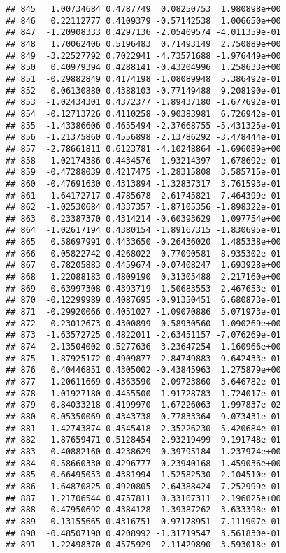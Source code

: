 \documentclass[
]{article}
\begin{document}
\begin{verbatim}
## 845   1.00734684 0.4787749  0.08250753  1.980898e+00
## 846   0.22112777 0.4109379 -0.57142538  1.006650e+00
## 847  -1.20908333 0.4297136 -2.05409574 -4.011359e-01
## 848   1.70062406 0.5196483  0.71493149  2.750889e+00
## 849  -3.22527792 0.7022941 -4.73571688 -1.976449e+00
## 850   0.40979394 0.4288141 -0.43204996  1.258633e+00
## 851  -0.29882849 0.4174198 -1.08089948  5.386492e-01
## 852   0.06130880 0.4388103 -0.77149488  9.208190e-01
## 853  -1.02434301 0.4372377 -1.89437180 -1.677692e-01
## 854  -0.12713726 0.4110258 -0.90383981  6.726942e-01
## 855  -1.43386606 0.4655494 -2.37668755 -5.431325e-01
## 856  -1.21375860 0.4556898 -2.13786292 -3.478444e-01
## 857  -2.78661811 0.6123781 -4.10248864 -1.696089e+00
## 858  -1.02174386 0.4434576 -1.93214397 -1.678692e-01
## 859  -0.47288039 0.4217475 -1.28315808  3.585715e-01
## 860  -0.47691630 0.4313894 -1.32837317  3.761593e-01
## 861  -1.64172717 0.4785678 -2.61745821 -7.464399e-01
## 862  -1.02530684 0.4337357 -1.87105356 -1.898322e-01
## 863   0.23387370 0.4314214 -0.60393629  1.097754e+00
## 864  -1.02617194 0.4380154 -1.89167315 -1.830695e-01
## 865   0.58697991 0.4433650 -0.26436020  1.485338e+00
## 866   0.05822742 0.4268022 -0.77090581  8.935302e-01
## 867   0.78205883 0.4459674 -0.07408247  1.693928e+00
## 868   1.22088183 0.4809190  0.31305488  2.217160e+00
## 869  -0.63997308 0.4393719 -1.50683553  2.467653e-01
## 870  -0.12299989 0.4087695 -0.91350451  6.680873e-01
## 871  -0.29920066 0.4051027 -1.09070886  5.071973e-01
## 872   0.23012673 0.4300899 -0.58930560  1.090269e+00
## 873  -1.63572725 0.4822011 -2.63451157 -7.076269e-01
## 874  -2.13504002 0.5277636 -3.23647254 -1.160966e+00
## 875  -1.87925172 0.4909877 -2.84749883 -9.642433e-01
## 876   0.40446851 0.4305002 -0.43845963  1.275879e+00
## 877  -1.20611669 0.4363590 -2.09723860 -3.646782e-01
## 878  -1.01927180 0.4455500 -1.91728783 -1.724017e-01
## 879  -0.84033218 0.4199970 -1.67226063 -1.997837e-02
## 880   0.05350069 0.4343738 -0.77833364  9.073431e-01
## 881  -1.42743874 0.4545418 -2.35226230 -5.420684e-01
## 882  -1.87659471 0.5128454 -2.93219499 -9.191748e-01
## 883   0.40882160 0.4238629 -0.39795184  1.237974e+00
## 884   0.58660330 0.4296777 -0.23940168  1.459036e+00
## 885  -0.66495053 0.4381994 -1.52582530  2.104510e-01
## 886  -1.64870825 0.4920805 -2.64388424 -7.252999e-01
## 887   1.21706544 0.4757811  0.33107311  2.196025e+00
## 888  -0.47950692 0.4384128 -1.39387262  3.633398e-01
## 889  -0.13155665 0.4316751 -0.97178951  7.111907e-01
## 890  -0.48507190 0.4208992 -1.31719547  3.561830e-01
## 891  -1.22498370 0.4575929 -2.11429890 -3.593018e-01

\end{verbatim}
\end{document}
